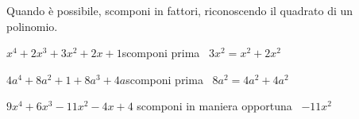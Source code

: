 \begin{esercizio}
\label{ese:16.18}
Quando è possibile, scomponi in fattori, riconoscendo il quadrato di un polinomio.
\begin{enumeratea}
 \item $x^{4}+2x^{3}+3x^{2}+2x+1$\quad  scomponi prima \quad~$3x^{2}=x^{2}+2x^{2}$
 \item $4a^{4}+8a^{2}+1+8a^{3}+4a$\quad  scomponi prima \quad~$8a^{2}=4a^{2}+4a^{2}$
 \item $9x^{4}+6x^{3}-11x^{2}-4x+4$ \quad scomponi in maniera opportuna \quad~$-11x^{2}$
\end{enumeratea}
\end{esercizio}


\paragraph*{}

